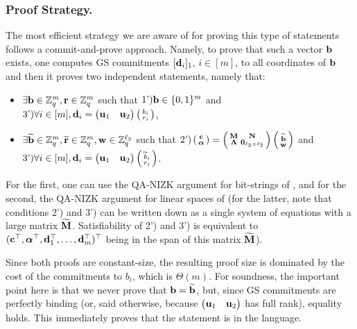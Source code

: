 \subsubsection{Proof Strategy.} The most efficient strategy we are aware of for proving this type of statements follows a 
 commit-and-prove approach. Namely, to prove that such a vector $\mathbf{b}$ exists, one computes 
GS commitments $[\mathbf{d}_i]_1$, $i \in [m]$, to all coordinates of $\mathbf{b}$ and then it proves two independent statements, namely that:
\vspace{-0.2cm}
\begin{itemize}
\item $\exists \mathbf{b}\in \mathbb{Z}_q^{m}, \mathbf{r} \in \mathbb{Z}_q^m$ such that  
$\text{1')} \mathbf{b}\in \{0,1\}^{m}$ and $\text{3')} \forall i \in [{m}], \mathbf{d}_i=\begin{pmatrix} \mathbf{u}_1 &   \mathbf{u}_2 \end{pmatrix}   \left(\begin{smallmatrix}b_i  \\ r_i\end{smallmatrix}\right)$,
\item   $\exists \widetilde{\mathbf{b}} \in \mathbb{Z}_q^{m},  \widetilde{\mathbf{r}} \in \mathbb{Z}_q^m, \mathbf{w} \in\mathbb{Z}_q^{\ell_2}$ such that  
   $\text{2')} \left(\begin{smallmatrix}
    \mathbf{c}\\
    {\boldsymbol \alpha}
\end{smallmatrix}\right)
=
\left(\begin{smallmatrix}
    \mathbf{{M}}       & \mathbf{{N}}\\
    \mathbf{{\Lambda}} & \mathbf{{0}}_{{\ell_3}\times {\ell_2}}
\end{smallmatrix}\right)
\left(\begin{smallmatrix}
    \widetilde{\mathbf{b}}\\
    \mathbf{w}
\end{smallmatrix}\right)$ and $\text{3')} \forall i \in [m], \mathbf{d}_i=\begin{pmatrix} \mathbf{u}_1 &   \mathbf{u}_2 \end{pmatrix}   \left(\begin{smallmatrix}
\widetilde{b}_i  \\ r_i\end{smallmatrix}\right)$.
\end{itemize}
For the first, one can use the QA-NIZK argument for bit-strings of \cite{AC:GonHevRaf15}, and for the second, the QA-NIZK argument for linear spaces of \cite{C:JutRoy14,EC:KilWee15} (for the latter, note that conditions 2') and 3') can be written down as a single system of equations with a large matrix $\widetilde{\mathbf{{M}}}$. Satisfiability of 
2') and 3') is equivalent to  $(\mathbf{c}^{\top},{\boldsymbol \alpha}^{\top},\mathbf{d}_1^{\top}, \ldots, \mathbf{d}_m^{\top})^\top$ being in the span 
of this matrix $\widetilde{\mathbf{{M}}}$).

Since both proofs are constant-size, the resulting proof size is dominated by the cost of the commitments to $b_i$, which is $\Theta(m)$. 
For soundness, the important point here is that we never prove that $\mathbf{b}=\widetilde{\mathbf{b}}$, but, since GS commitments are perfectly binding (or, said otherwise, because $\begin{pmatrix} \mathbf{u}_1 &   \mathbf{u}_2 \end{pmatrix}$
has full rank), equality holds. This immediately proves that the statement is in the language.  
